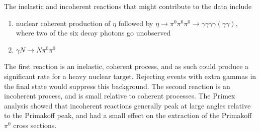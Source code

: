 The inelastic and incoherent reactions that might contribute to the
data include
\begin{enumerate}[label=(\roman*)]
    \item nuclear coherent production of $\eta$ followed by $\eta\rightarrow \pi^0\pi^0\pi^0 \rightarrow \gamma\gamma\gamma\gamma(\gamma\gamma)$, where two of the six decay photons go unobserved
    \item $\gamma N \rightarrow N \pi^0\pi^0$
\end{enumerate}

The first reaction is an inelastic, coherent process, and as such
could produce a significant rate for a heavy nuclear target. Rejecting
events with extra gammas in the final state would suppress this
background.  The second reaction is an incoherent process, and is
small relative to coherent processes.  The Primex analysis showed that
incoherent reactions generally peak at large angles relative to the
Primakoff peak, and had a small effect on the extraction of the
Primakoff $\pi^0$ cross sections.

